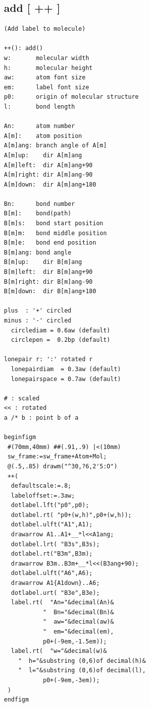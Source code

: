\documentclass[a4paper]{article}
\begin{document}
\subsection{add [ ++ ]}
%
\index{++}%
%
%
%
%
%
%
%
%
%
%
%
%
%
\index{/*}%
\index{**}%
\index{\textgreater\textgreater}%
%
%
%
%
%
%
%
%
%
%
%
%
%
%
%
%
%
%
%
\begin{verbatim}
(Add label to molecule)

++(): add()
w:       molecular width
h:       molecular height
aw:      atom font size
em:      label font size
p0:      origin of molecular structure
l:       bond length

An:      atom number
A[m]:    atom position
A[m]ang: branch angle of A[m]
A[m]up:    dir A[m]ang
A[m]left:  dir A[m]ang+90
A[m]right: dir A[m]ang-90
A[m]down:  dir A[m]ang+180

Bn:      bond number
B[m]:    bond(path)
B[m]s:   bond start position
B[m]m:   bond middle position
B[m]e:   bond end position
B[m]ang: bond angle
B[m]up:    dir B[m]ang
B[m]left:  dir B[m]ang+90
B[m]right: dir B[m]ang-90
B[m]down:  dir B[m]ang+180

plus  : '+' circled
minus : '-' circled
  circlediam = 0.6aw (default)
  circlepen =  0.2bp (default)

lonepair r: ':' rotated r
  lonepairdiam  = 0.3aw (default)
  lonepairspace = 0.7aw (default)

# : scaled
<< : rotated
a /* b : point b of a

beginfigm
 #(70mm,40mm) ##(.91,.9) |<(10mm)
 sw_frame:=sw_frame+Atom+Mol;
 @(.5,.85) drawm("^30,?6,2'5:O")
 ++(
  defaultscale:=.8;
  labeloffset:=.3aw;
  dotlabel.lft("p0",p0);
  dotlabel.rt( "p0+(w,h)",p0+(w,h));
  dotlabel.ulft("A1",A1);
  drawarrow A1..A1+__*l<<A1ang;
  dotlabel.lrt( "B3s",B3s);
  dotlabel.rt("B3m",B3m);
  drawarrow B3m..B3m+__*l<<(B3ang+90);
  dotlabel.ulft("A6",A6);
  drawarrow A1{A1down}..A6;
  dotlabel.urt( "B3e",B3e);
  label.rt(  "An="&decimal(An)&
           "  Bn="&decimal(Bn)&
           "  aw="&decimal(aw)&
           "  em="&decimal(em),
           p0+(-9em,-1.5em));
  label.rt(  "w="&decimal(w)&
    "  h="&substring (0,6)of decimal(h)&
    "  l="&substring (0,6)of decimal(l),
           p0+(-9em,-3em));
 )
endfigm
\end{verbatim}
\end{document}
